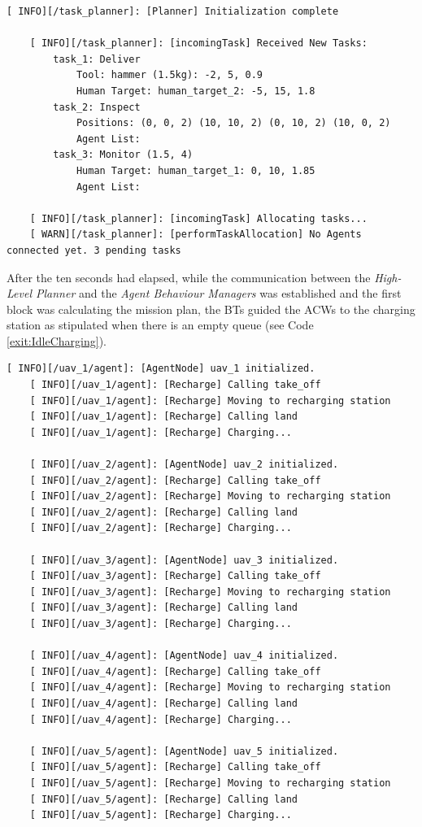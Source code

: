 \begin{lstlisting}[caption={Feedback messages printed after the start of the simulation before the ACWs were connected}, breaklines=true, label=exit:NoAgentsCoonectedYet]
    [ INFO][/task_planner]: [Planner] Initialization complete

    [ INFO][/task_planner]: [incomingTask] Received New Tasks:
	    task_1: Deliver
		    Tool: hammer (1.5kg): -2, 5, 0.9
		    Human Target: human_target_2: -5, 15, 1.8
	    task_2: Inspect
		    Positions: (0, 0, 2) (10, 10, 2) (0, 10, 2) (10, 0, 2)
		    Agent List:
	    task_3: Monitor (1.5, 4)
		    Human Target: human_target_1: 0, 10, 1.85
		    Agent List:

    [ INFO][/task_planner]: [incomingTask] Allocating tasks...
    [ WARN][/task_planner]: [performTaskAllocation] No Agents connected yet. 3 pending tasks
\end{lstlisting}

After the ten seconds had elapsed, while the communication between the \emph{High-Level Planner} and the \emph{Agent Behaviour Managers} was established and the first block was calculating the mission plan, the \glspl{BT} guided the \glspl{ACW} to the charging station as stipulated when there is an empty queue (see Code \ref{exit:IdleCharging}).

\begin{lstlisting}[caption={Feedback messages printed before the \glspl{ACW} received their new queues}, breaklines=true, label=exit:IdleCharging]
    [ INFO][/uav_1/agent]: [AgentNode] uav_1 initialized.
    [ INFO][/uav_1/agent]: [Recharge] Calling take_off
    [ INFO][/uav_1/agent]: [Recharge] Moving to recharging station
    [ INFO][/uav_1/agent]: [Recharge] Calling land
    [ INFO][/uav_1/agent]: [Recharge] Charging...
    
    [ INFO][/uav_2/agent]: [AgentNode] uav_2 initialized.
    [ INFO][/uav_2/agent]: [Recharge] Calling take_off
    [ INFO][/uav_2/agent]: [Recharge] Moving to recharging station
    [ INFO][/uav_2/agent]: [Recharge] Calling land
    [ INFO][/uav_2/agent]: [Recharge] Charging...
    
    [ INFO][/uav_3/agent]: [AgentNode] uav_3 initialized.
    [ INFO][/uav_3/agent]: [Recharge] Calling take_off
    [ INFO][/uav_3/agent]: [Recharge] Moving to recharging station
    [ INFO][/uav_3/agent]: [Recharge] Calling land
    [ INFO][/uav_3/agent]: [Recharge] Charging...
    
    [ INFO][/uav_4/agent]: [AgentNode] uav_4 initialized.
    [ INFO][/uav_4/agent]: [Recharge] Calling take_off
    [ INFO][/uav_4/agent]: [Recharge] Moving to recharging station
    [ INFO][/uav_4/agent]: [Recharge] Calling land
    [ INFO][/uav_4/agent]: [Recharge] Charging...

    [ INFO][/uav_5/agent]: [AgentNode] uav_5 initialized.
    [ INFO][/uav_5/agent]: [Recharge] Calling take_off
    [ INFO][/uav_5/agent]: [Recharge] Moving to recharging station
    [ INFO][/uav_5/agent]: [Recharge] Calling land
    [ INFO][/uav_5/agent]: [Recharge] Charging...
\end{lstlisting}

